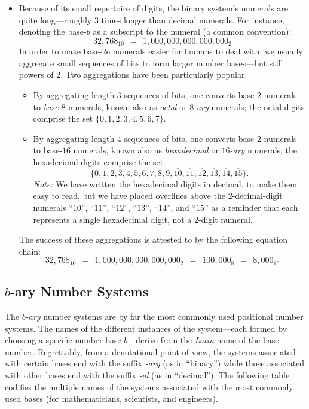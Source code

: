 \begin{itemize}
\item
Because of its small repertoire of digits, the binary system's
numerals are quite long---roughly $3$ times longer than decimal
numerals.  For instance, denoting the base-$b$ as a subscript to the
numeral (a common convention):
\[ 32,768_{10} \ \ = \ \ 1,000,000,000,000,000_2 \]
In order to make base-$2$e numerals easier for humans to deal with, we
usually aggregate small sequences of bits to form larger number
bases---but still powers of $2$.  Two aggregations have been
particularly popular:
  \begin{itemize}
  \item
By aggregating length-$3$ sequences of bits, one converts base-$2$
numerals to {\it base}-$8$ numerals, known also as {\it octal} or
$8$-{\it ary} numerals;
 the octal digits comprise
the set $\{0, 1, 2, 3, 4, 5, 6, 7\}$.
  \item
By aggregating length-$4$ sequences of bits, one converts base-$2$
numerals to base-$16$ numerals, known also as {\it hexadecimal} or
{\it $16$-ary} numerals;  
the hexadecimal digits comprise the set 
\[ \{0, 1, 2, 3, 4, 5, 6, 7, 8, 9, \overline{10}, \overline{11},
\overline{12}, \overline{13}, \overline{14}, \overline{15}\}.
\]
{\it Note:} We have written the hexadecimal digits in decimal, to make
them easy to read, but we have placed overlines above the
$2$-decimal-digit numerals ``$10$'', ``$11$'', ``$12$'', ``$13$'',
``$14$'', and ``$15$'' as a reminder that each represents a single
hexadecimal digit, not a $2$-digit numeral.
  \end{itemize}
The success of these aggregations is attested to by the following
equation chain:
\[ 32,768_{10} \ \ = \ \ 1,000,000,000,000,000_2 \ \ = \ \
100,000_8 \ \ = \ \ 8,000_{16}
\]
\end{itemize}

\subsection{$b$-ary Number Systems}
\label{sec:b-ary-systems}

The {\it $b$-ary} number systems are by far the most commonly used
positional number systems.  The names of the different instances of
the system---each formed by choosing a specific number base
$b$---derive from the {\em Latin} name of the base number.
Regrettably, from a denotational point of view, the systems associated
with certain bases end with the suffix {\em -ary} (as in ``binary'')
while those associated with other bases end with the suffix {\em -al}
(as in ``decimal'').  The following table codifies the multiple names
of the systems associated with the most commonly used bases (for
mathematicians, scientists, and engineers).

